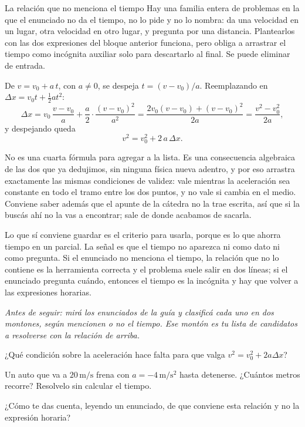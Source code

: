 \documentclass[11pt,openany]{book}
\begin{document}
\begin{bloque}{La relación que no menciona el tiempo}
Hay una familia entera de problemas en la que el enunciado no da el tiempo, no lo pide y no lo nombra: da una velocidad en un lugar, otra velocidad en otro lugar, y pregunta por una distancia. Plantearlos con las dos expresiones del bloque anterior funciona, pero obliga a arrastrar el tiempo como incógnita auxiliar solo para descartarlo al final. Se puede eliminar de entrada.

De $v = v_0 + a\,t$, con $a\neq 0$, se despeja $t = (v-v_0)/a$. Reemplazando en $\Delta x = v_0 t + \tfrac12 a t^2$:
\[
\Delta x = v_0\,\frac{v-v_0}{a} + \frac{a}{2}\cdot\frac{(v-v_0)^2}{a^2}
= \frac{2v_0(v-v_0) + (v-v_0)^2}{2a}
= \frac{v^2-v_0^2}{2a},
\]
y despejando queda
\[
v^2 = v_0^2 + 2\,a\,\Delta x.
\]

No es una cuarta fórmula para agregar a la lista. Es una consecuencia algebraica de las dos que ya dedujimos, sin ninguna física nueva adentro, y por eso arrastra exactamente las mismas condiciones de validez: vale mientras la aceleración sea constante en todo el tramo entre los dos puntos, y no vale si cambia en el medio. Conviene saber además que el apunte de la cátedra no la trae escrita, así que si la buscás ahí no la vas a encontrar; sale de donde acabamos de sacarla.

Lo que sí conviene guardar es el criterio para usarla, porque es lo que ahorra tiempo en un parcial. La señal es que el tiempo no aparezca ni como dato ni como pregunta. Si el enunciado no menciona el tiempo, la relación que no lo contiene es la herramienta correcta y el problema suele salir en dos líneas; si el enunciado pregunta cuándo, entonces el tiempo es la incógnita y hay que volver a las expresiones horarias.

\textit{Antes de seguir: mirá los enunciados de la guía y clasificá cada uno en dos montones, según mencionen o no el tiempo. Ese montón es tu lista de candidatos a resolverse con la relación de arriba.}
\end{bloque}

\begin{chequeo}
\item ¿Qué condición sobre la aceleración hace falta para que valga $v^2 = v_0^2 + 2a\Delta x$?
\item Un auto que va a $20\,\mathrm{m/s}$ frena con $a = -4\,\mathrm{m/s^2}$ hasta detenerse. ¿Cuántos metros recorre? Resolvelo sin calcular el tiempo.
\item ¿Cómo te das cuenta, leyendo un enunciado, de que conviene esta relación y no la expresión horaria?
\end{chequeo}
\end{document}
